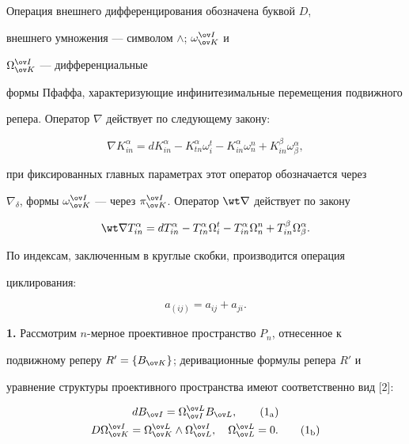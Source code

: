  


Операция внешнего дифференцирования обозначена буквой $D$, 


внешнего умножения --- символом $\wedge$; $\omega^{\ov I}_{\ov K}$ и 


$\Omega^{\ov I}_{\ov K}$ --- дифференциальные 


формы Пфаффа, характеризующие инфинитезимальные перемещения подвижного 


репера. Оператор $\nabla$ действует по следующему закону: 


$$ 


\nabla K^\alpha_{in}=dK^\alpha_{in}-K^\alpha_{tn}\omega^t_i- 


K^\alpha_{in}\omega^n_n+K^\beta_{in}\omega^\alpha_\beta, 


$$ 


при фиксированных главных параметрах этот оператор обозначается через 


$\nabla_\delta$, формы $\omega^{\ov I}_{\ov K}$ --- через $\pi^{\ov I}_{\ov 


K}$. Оператор $\wt\nabla$ действует по закону 


$$ 


\wt\nabla T^\alpha_{in}=dT^\alpha_{in}-T^\alpha_{tn}\Omega^t_i- 


T^\alpha_{in}\Omega^n_n+T^\beta_{in}\Omega^\alpha_\beta. 


$$ 


По индексам, заключенным в круглые скобки, производится операция 


циклирования: 


$$ 


a_{(ij)}=a_{ij}+a_{ji}. 


$$ 


 


{\bf 1.} Рассмотрим $n$-мерное проективное пространство $P_n$, отнесенное к 


подвижному реперу $R'=\{B_{\ov K}\}$; деривационные формулы репера $R'$ и 


уравнение структуры проективного пространства имеют соответственно вид [2]: 


\begin{gather} 


dB_{\ov I}=\Omega^{\ov L}_{\ov I}B_{\ov L},\tag{1${}_{\mathrm a}$} \\ 


D\Omega^{\ov I}_{\ov K}=\Omega^{\ov L}_{\ov K}\wedge 


\Omega^{\ov I}_{\ov L},\quad 


\Omega^{\ov L}_{\ov L}=0. \tag{1${}_{\mathrm b}$} 


\end{gather} 


